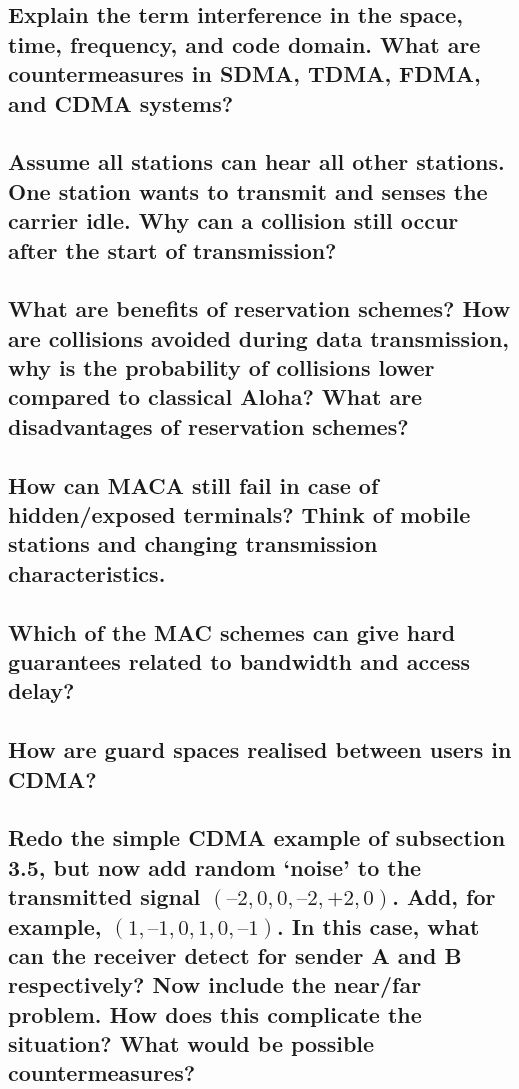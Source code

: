 \subsection{Explain the term interference in the space, time, frequency, and code domain. What
are countermeasures in SDMA, TDMA, FDMA, and CDMA systems?}

\subsection{Assume all stations can hear all other stations. One station wants to transmit and
senses the carrier idle. Why can a collision still occur after the start of transmission?}

\subsection{What are benefits of reservation schemes? How are collisions avoided during data
transmission, why is the probability of collisions lower compared to classical Aloha?
What are disadvantages of reservation schemes?}

\subsection{How can MACA still fail in case of hidden/exposed terminals? Think of mobile stations
and changing transmission characteristics.}

\subsection{Which of the MAC schemes can give hard guarantees related to bandwidth and
access delay?}

\subsection{How are guard spaces realised between users in CDMA?}

\subsection{Redo the simple CDMA example of subsection 3.5, but now add random ‘noise’ to the
transmitted signal $(–2,0,0,–2,+2,0)$. Add, for example, $(1,–1,0,1,0,–1)$. In this case,
what can the receiver detect for sender A and B respectively? Now include the
near/far problem. How does this complicate the situation? What would be possible
countermeasures?}